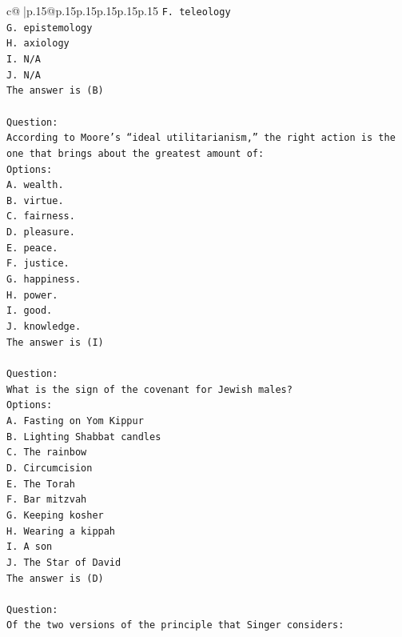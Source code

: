 \documentclass{article}
\begin{document}
{\begin{supertabular}{c@{$\;$}|p{.15\linewidth}@{}p{.15\linewidth}p{.15\linewidth}p{.15\linewidth}p{.15\linewidth}p{.15\linewidth}}
{{{\texttt{F. teleology} \\
\texttt{G. epistemology} \\
\texttt{H. axiology} \\
\texttt{I. N/A} \\
\texttt{J. N/A} \\
\texttt{The answer is (B)} \\
\\ 
\texttt{Question:} \\
\texttt{According to Moore’s “ideal utilitarianism,” the right action is the one that brings about the greatest amount of:} \\
\texttt{Options:} \\
\texttt{A. wealth.} \\
\texttt{B. virtue.} \\
\texttt{C. fairness.} \\
\texttt{D. pleasure.} \\
\texttt{E. peace.} \\
\texttt{F. justice.} \\
\texttt{G. happiness.} \\
\texttt{H. power.} \\
\texttt{I. good.} \\
\texttt{J. knowledge.} \\
\texttt{The answer is (I)} \\
\\ 
\texttt{Question:} \\
\texttt{What is the sign of the covenant for Jewish males?} \\
\texttt{Options:} \\
\texttt{A. Fasting on Yom Kippur} \\
\texttt{B. Lighting Shabbat candles} \\
\texttt{C. The rainbow} \\
\texttt{D. Circumcision} \\
\texttt{E. The Torah} \\
\texttt{F. Bar mitzvah} \\
\texttt{G. Keeping kosher} \\
\texttt{H. Wearing a kippah} \\
\texttt{I. A son} \\
\texttt{J. The Star of David} \\
\texttt{The answer is (D)} \\
\\ 
\texttt{Question:} \\
\texttt{Of the two versions of the principle that Singer considers:} \\
}}}
\end{supertabular}}
\end{document}
